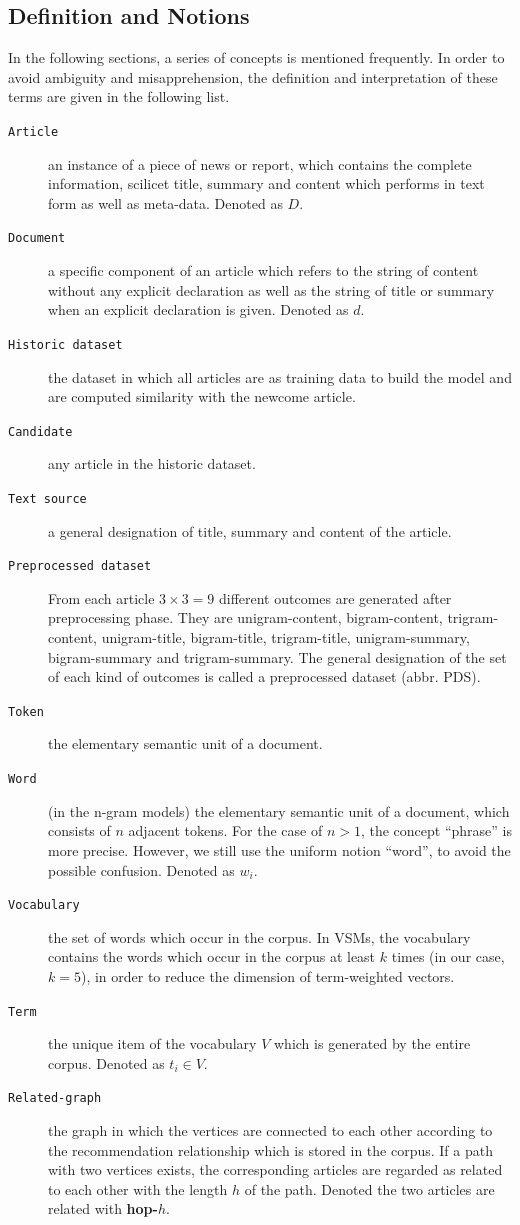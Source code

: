 \subsection{Definition and Notions}
\label{sec:4.2}

In the following sections, a series of concepts is mentioned frequently. In order to avoid ambiguity and misapprehension, the definition and interpretation of these terms are given in the following list.

\begin{description}
\item[\texttt{Article}] an instance of a piece of news or report, which contains the complete information, scilicet title, summary and content which performs in text form as well as meta-data. Denoted as $D$.
\item[\texttt{Document}] a specific component of an article which refers to the string of content without any explicit declaration as well as the string of title or summary when an explicit declaration is given. Denoted as $d$.
\item[\texttt{Historic dataset}] the dataset in which all articles are as training data to build the model and are computed similarity with the newcome article. 
\item[\texttt{Candidate}] any article in the historic dataset.
\item[\texttt{Text source}] a general designation of title, summary and content of the article.
\item[\texttt{Preprocessed dataset}] From each article $3\times3=9$ different outcomes are generated after preprocessing phase. They are unigram-content, bigram-content, trigram-content, unigram-title, bigram-title, trigram-title, unigram-summary, bigram-summary and trigram-summary. The general designation of the set of each kind of outcomes is called a preprocessed dataset (abbr. PDS). 
\item[\texttt{Token}] the elementary semantic unit of a document.
\item[\texttt{Word}] (in the n-gram models) the elementary semantic unit of a document, which consists of $n$ adjacent tokens. For the case of $n > 1$, the concept ``phrase'' is more precise. However, we still use the uniform notion ``word'', to avoid the possible confusion. Denoted as $w_i$. 
\item[\texttt{Vocabulary}] the set of words which occur in the corpus. In VSMs, the vocabulary contains the words which occur in the corpus at least $k$ times (in our case, $k=5$), in order to reduce the dimension of term-weighted vectors. 
\item[\texttt{Term}] the unique item of the vocabulary $V$ which is generated by the entire corpus. Denoted as $t_i \in V$. 
\item[\texttt{Related-graph}] the graph in which the vertices are connected to each other according to the recommendation relationship which is stored in the corpus. If a path with two vertices exists, the corresponding articles are regarded as related to each other with the length $h$ of the path. Denoted the two articles are related with \textbf{hop-$h$}.

\label{tab:def_terms}
\end{description}


